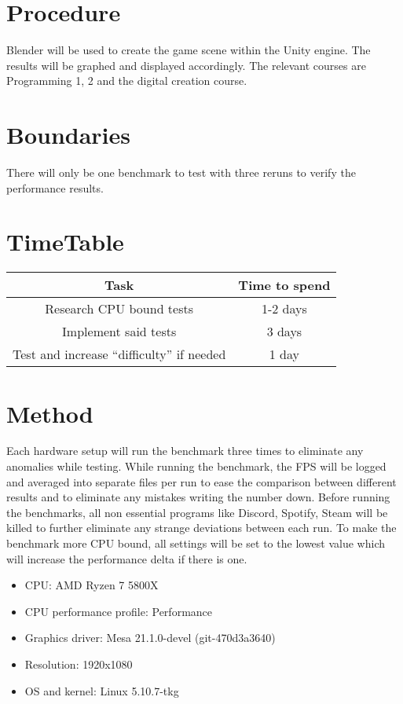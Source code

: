 \documentclass{article}
\begin{document}
\section{Procedure}
Blender will be used to create the game scene within the Unity engine. The results will be graphed and displayed accordingly. The relevant courses are Programming 1, 2 and the digital creation course.

\section {Boundaries}
There will only be one benchmark to test with three reruns to verify the performance results.

\section {TimeTable}
\begin{center}
\begin{tabular}{ |c|c| } 
 \hline
    \textbf {Task} & \textbf {Time to spend} \\ [0.5ex] 
 \hline\hline
    Research CPU bound tests & 1-2 days \\ 
    \hline
    Implement said tests & 3 days \\ 
    \hline
    Test and increase “difficulty” if needed & 1 day \\ 
 \hline
\end{tabular}
\end{center}


\section {Method}
Each hardware setup will run the benchmark three times to eliminate any anomalies while testing. While running the benchmark, the FPS will be logged and averaged into separate files per run to ease the comparison between different results and to eliminate any mistakes writing the number down. Before running the benchmarks, all non essential programs like Discord, Spotify, Steam will be killed to further eliminate any strange deviations between each run. To make the benchmark more CPU bound, all settings will be set to the lowest value which will increase the performance delta if there is one.

\begin{itemize}
    \item CPU: AMD Ryzen 7 5800X
    \item CPU performance profile: Performance
    \item Graphics driver: Mesa 21.1.0-devel (git-470d3a3640)
    \item Resolution: 1920x1080
    \item OS and kernel: Linux 5.10.7-tkg
\end{itemize}




\end{document}
